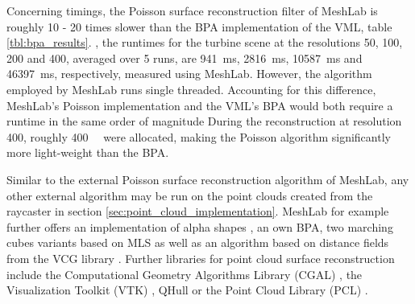 Concerning timings, the Poisson surface reconstruction filter of MeshLab is roughly 10 - 20 times slower than the BPA implementation of the VML, \cf table \ref{tbl:bpa_results}.
\Eg, the runtimes for the turbine scene at the resolutions 50, 100, 200 and 400, averaged over 5 runs, are \SI{941}{\milli\second}, \SI{2816}{\milli\second}, \SI{10587}{\milli\second} and \SI{46397}{\milli\second}, respectively, measured using MeshLab.
However, the algorithm employed by MeshLab runs single threaded.
Accounting for this difference, MeshLab's Poisson implementation and the VML's BPA would both require a runtime in the same order of magnitude
During the reconstruction at resolution 400, roughly \SI{400}{\mebi\byte} were allocated, making the Poisson algorithm significantly more light-weight than the BPA.

Similar to the external Poisson surface reconstruction algorithm of MeshLab, any other external algorithm may be run on the point clouds created from the raycaster in section \ref{sec:point_cloud_implementation}.
MeshLab for example further offers an implementation of alpha shapes \cite{alpha_shape}, an own BPA, two marching cubes variants based on MLS \cite{meshlab_mc_mls_1, meshlab_mc_mls_2} as well as an algorithm based on distance fields from the VCG library \cite{vcg}.
Further libraries for point cloud surface reconstruction include the Computational Geometry Algorithms Library (CGAL) \cite{cgal}, the Visualization Toolkit (VTK) \cite{vtk}, QHull \cite{qhull} or the Point Cloud Library (PCL) \cite{pcl}.
